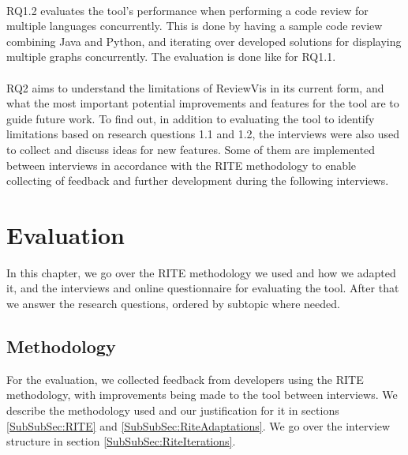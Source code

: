 \documentclass[a4paper,11pt,twoside]{article}
\theoremstyle{definition} %
\begin{document}
\\

RQ1.2 evaluates the tool’s performance when performing a code review for multiple languages concurrently. This is done by having a sample code review combining Java and Python, and iterating over developed solutions for displaying multiple graphs concurrently. The evaluation is done like for RQ1.1.
\\

\\

RQ2 aims to understand the limitations of ReviewVis in its current form, and what the most important potential improvements and features for the tool are to guide future work. To find out, in addition to evaluating the tool to identify limitations based on research questions 1.1 and 1.2, the interviews were also used to collect and discuss ideas for new features. Some of them are implemented between interviews in accordance with the RITE methodology to enable collecting of feedback and further development during the following interviews.

\newpage


\section{Evaluation} \label{Sec:Evaluation}

In this chapter, we go over the RITE methodology we used and how we adapted it, and the interviews and online questionnaire for evaluating the tool. After that we answer the research questions, ordered by subtopic where needed.


\subsection{Methodology} \label{SubSec:Methodology}
For the evaluation, we collected feedback from developers using the RITE methodology, with improvements being made to the tool between interviews. We describe the methodology used and our justification for it in sections \ref{SubSubSec:RITE} and \ref{SubSubSec:RiteAdaptations}. We go over the interview structure in section \ref{SubSubSec:RiteIterations}.
\end{document}
